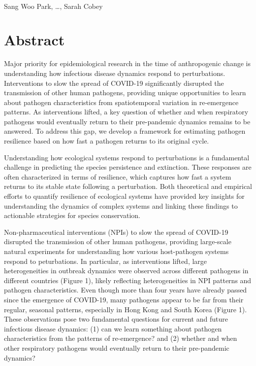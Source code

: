 \documentclass[12pt]{article}
\date{\today}
\begin{document}
\begin{flushleft}{
	\Large
	\textbf{}
}
\newline
\\
Sang Woo Park, \dots, Sarah Cobey
\\
\bigskip
\end{flushleft}

\section*{Abstract}

Major priority for epidemiological research in the time of anthropogenic change is understanding how infectious disease dynamics respond to perturbations.
Interventions to slow the spread of COVID-19 significantly disrupted the transmission of other human pathogens, providing unique opportunities to learn about pathogen characteristics from spatiotemporal variation in re-emergence patterns. 
As interventions lifted, a key question of whether and when respiratory pathogens would eventually return to their pre-pandemic dynamics remains to be answered. 
To address this gap, we develop a framework for estimating pathogen resilience based on how fast a pathogen returns to its original cycle.

\pagebreak

Understanding how ecological systems respond to perturbations is a fundamental challenge in predicting the species persistence and extinction.
These responses are often characterized in terms of resilience, which captures how fast a system returns to its stable state following a perturbation.
Both theoretical and empirical efforts to quantify resilience of ecological systems have provided key insights for understanding the dynamics of complex systems and linking these findings to actionable strategies for species conservation.

Non-pharmaceutical interventions (NPIs) to slow the spread of COVID-19 disrupted the transmission of other human pathogens, providing large-scale natural experiments for understanding how various host-pathogen systems respond to peturbations.
In particular, as interventions lifted, large heterogeneities in outbreak dynamics were observed across different pathogens in different countries (Figure 1), likely reflecting heterogeneities in NPI patterns and pathogen characteristics.
Even though more than four years have already passed since the emergence of COVID-19, many pathogens appear to be far from their regular, seasonal patterns, especially in Hong Kong and South Korea (Figure 1).
These observations pose two fundamental questions for current and future infectious disease dynamics: (1) can we learn something about pathogen characteristics from the patterns of re-emergence? and (2) whether and when other respiratory pathogens would eventually return to their pre-pandemic dynamics?
\end{document}
